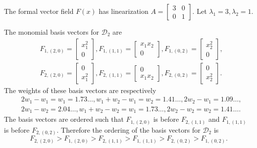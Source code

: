 \documentclass{article}
\begin{document}
The formal vector field $F(x)$ has linearization $A=\begin{bmatrix}3&0\\0&1\end{bmatrix}$. Let $\lambda_1=3,\lambda_2=1$.

The monomial basis vectors for $\mathscr{D}_2$ are
\[
\begin{split}
&F_{1,(2,0)}=\begin{bmatrix}x_1^2\\0\end{bmatrix},
F_{1,(1,1)}=\begin{bmatrix}x_1 x_2\\0\end{bmatrix},
F_{1,(0,2)}=\begin{bmatrix}x_2^2\\0\end{bmatrix},\\
&F_{2,(2,0)}=\begin{bmatrix}0\\ x_1^2\end{bmatrix},
F_{2,(1,1)}=\begin{bmatrix}0\\ x_1 x_2\end{bmatrix},
F_{2,(0,2)}=\begin{bmatrix}0\\ x_2^2\end{bmatrix}.
\end{split}
\]
The weights of these basis vectors are respectively
\[
\begin{split}
&2w_1-w_1=w_1=1.73\ldots, w_1+w_2-w_1=w_2=1.41\ldots,
2w_2-w_1=1.09\ldots,\\
&2w_1-w_2=2.04\ldots,
w_1+w_2-w_2=w_1=1.73\ldots,
2w_2-w_2=w_2=1.41\ldots.
\end{split}
\]
The basis vectors are ordered such that $F_{1,(2,0)}$ is before $F_{2,(1,1)}$
and $F_{1,(1,1)}$ is before $F_{2,(0,2)}$. Therefore the ordering of the basis vectors for $\mathscr{D}_2$
is
\begin{equation}
\label{orderedbasisD2}
F_{2,(2,0)}>F_{1,(2,0)}>F_{2,(1,1)}>F_{1,(1,1)}>F_{2,(0,2)}>F_{1,(0,2)}.
\end{equation}
\end{document}
